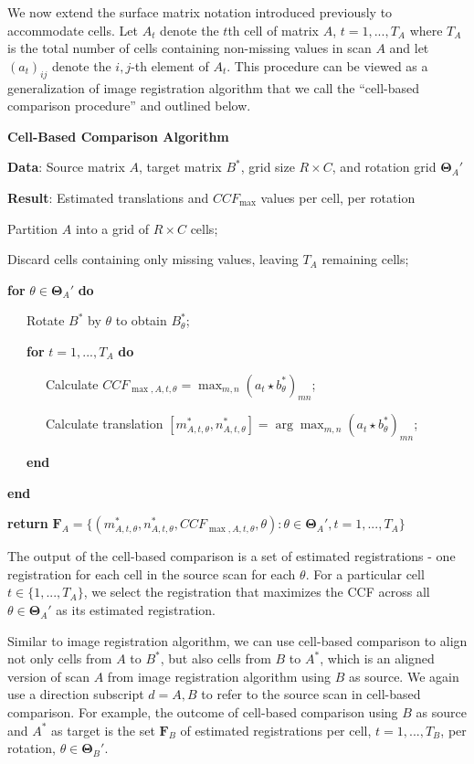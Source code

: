 \documentclass[11pt,]{isuthesis}
\begin{document}
We now extend the surface matrix notation introduced previously to accommodate cells.
Let \(A_{t}\) denote the \(t\)th cell of matrix \(A\), \(t = 1,...,T_A\) where \(T_A\) is the total number of cells containing non-missing values in scan \(A\) and let \((a_t)_{ij}\) denote the \(i,j\)-th element of \(A_t\).
This procedure can be viewed as a generalization of image registration algorithm that we call the ``cell-based comparison procedure'' and outlined below.

\textbf{Cell-Based Comparison Algorithm}

\textbf{Data}: Source matrix \(A\), target matrix \(B^*\), grid size \(R \times C\), and rotation grid \(\pmb{\Theta}_{A}'\)

\textbf{Result}: Estimated translations and \(CCF_{\max}\) values per cell, per rotation

Partition \(A\) into a grid of \(R \times C\) cells;

Discard cells containing only missing values, leaving \(T_A\) remaining cells;

\textbf{for} \(\theta \in \pmb{\Theta}_{A}'\) \textbf{do}

~~~Rotate \(B^*\) by \(\theta\) to obtain \(B_{\theta}^*\);

~~~\textbf{for} \(t = 1,...,T_A\) \textbf{do}

~~~~~~Calculate \(CCF_{\max,A,t,\theta} = \max_{m,n} (a_t \star b_{\theta}^*)_{mn}\);

~~~~~~Calculate translation \([m_{A,t,\theta}^*, n_{A,t,\theta}^*] = \arg \max_{m,n} (a_t \star b_{\theta}^*)_{mn}\);

~~~\textbf{end}

\textbf{end}

\textbf{return} \(\pmb{F}_A = \{(m_{A,t,\theta}^*, n_{A,t,\theta}^*, CCF_{\max,A,t,\theta}, \theta) : \theta \in \pmb{\Theta}_{A}', t = 1,...,T_A\}\)

The output of the cell-based comparison is a set of estimated registrations - one registration for each cell in the source scan for each \(\theta\).
For a particular cell \(t \in \{1,...,T_A\}\), we select the registration that maximizes the CCF across all \(\theta \in \pmb{\Theta}_A'\) as its estimated registration.

Similar to image registration algorithm, we can use cell-based comparison to align not only cells from \(A\) to \(B^*\), but also cells from \(B\) to \(A^*\), which is an aligned version of scan \(A\) from image registration algorithm using \(B\) as source.
We again use a direction subscript \(d = A,B\) to refer to the source scan in cell-based comparison.
For example, the outcome of cell-based comparison using \(B\) as source and \(A^*\) as target is the set \(\pmb{F}_B\) of estimated registrations per cell, \(t = 1,...,T_B\), per rotation, \(\theta \in \pmb{\Theta}_B'\).
\end{document}
